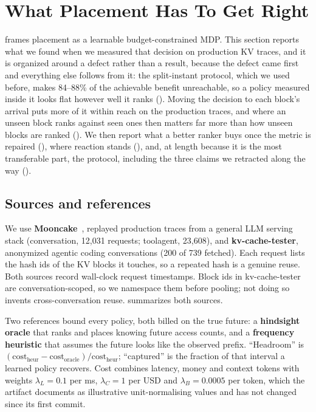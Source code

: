 \section{What Placement Has To Get Right}
\label{sec:evidence}

 frames placement as a learnable budget-constrained MDP. This section reports what
we found when we measured that decision on production KV traces, and it is organized around a defect rather
than a result, because the defect came first and everything else follows from it: the split-instant
protocol, which we used before, makes 84--88\% of the achievable benefit unreachable, so a
policy measured inside it looks flat however well it ranks (). Moving the decision to
each block's arrival puts more of it within reach on the production traces, and where an unseen block
ranks against seen ones then matters far more than how unseen blocks are ranked (). We then report what a
better ranker buys once the metric is repaired (), where reaction stands
(), and, at length because it is the most transferable part, the protocol,
including the three claims we retracted along the way ().

\subsection{Sources and references}
\label{sec:sources}
We use \textbf{Mooncake}~\cite{qin2024mooncake}, replayed production traces from a general LLM serving
stack (conversation, 12{,}031 requests; toolagent, 23{,}608), and \textbf{kv-cache-tester}, anonymized agentic coding
conversations (200 of 739 fetched). Each request lists the hash ids of the KV blocks it touches, so a
repeated hash is a genuine reuse. Both sources record wall-clock request timestamps. Block ids in
kv-cache-tester are conversation-scoped, so we namespace them before pooling; not doing so invents
cross-conversation reuse.  summarizes both sources.

Two references bound every policy, both billed on the true future: a \textbf{hindsight oracle} that ranks
and places knowing future access counts, and a \textbf{frequency heuristic} that assumes the future looks
like the observed prefix. ``Headroom'' is
$(\text{cost}_{\text{heur}} - \text{cost}_{\text{oracle}})/\text{cost}_{\text{heur}}$; ``captured'' is the
fraction of that interval a learned policy recovers. Cost combines latency, money and context tokens
with weights $\lambda_L = 0.1$ per ms, $\lambda_C = 1$ per USD and $\lambda_B = 0.0005$ per token, which
the artifact documents as illustrative unit-normalising values and has not changed since its first
commit.

